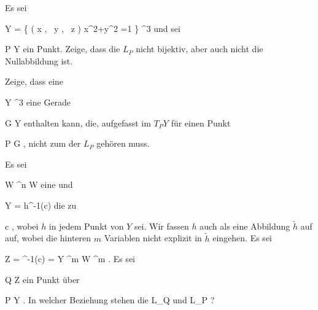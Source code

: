{}
{

Es sei

\mavergleichskettedisp
{\vergleichskette
{ Y
}
{ =} { \left\{  \left(  x   , \,   y  , \,  z                 \right)   \mid   x^2+y^2 =1         \right\}
}
{ \subseteq} { \R^3
}
{ } {
}
{ } {
}
}
{}{}{}
und sei

\mavergleichskette
{\vergleichskette
{ P
}
{ \in }{ Y
}
{  }{
}
{    }{
}
{   }{}
}
{}{}{}
ein Punkt. Zeige, dass die
$L_P$ nicht bijektiv, aber auch nicht die Nullabbildung ist.

}
{} {}

{}
{

Zeige, dass eine

\mavergleichskette
{\vergleichskette
{ Y
}
{ \subseteq }{ \R^3
}
{  }{
}
{    }{
}
{   }{
}
}
{}{}{}
eine Gerade

\mavergleichskette
{\vergleichskette
{ G
}
{ \subseteq }{ Y
}
{  }{
}
{    }{
}
{   }{
}
}
{}{}{}
enthalten kann, die, aufgefasst im
$T_PY$ für einen Punkt

\mavergleichskette
{\vergleichskette
{ P
}
{ \in }{ G
}
{  }{
}
{    }{
}
{   }{
}
}
{}{}{,}
nicht zum
der
$L_P$ gehören muss.

}
{} {}

{}
{

Es sei

\mavergleichskette
{\vergleichskette
{ W
}
{ \subseteq }{ \R^n
}
{  }{
}
{    }{
}
{   }{
}
}
{}{}{}
 { W } { \R
} {}
eine
und

\mavergleichskette
{\vergleichskette
{ Y
}
{ = }{ h^{-1}(c)
}
{  }{
}
{    }{
}
{   }{
}
}
{}{}{}
die
zu

\mavergleichskette
{\vergleichskette
{ c
}
{ \in }{ \R
}
{  }{
}
{    }{
}
{   }{
}
}
{}{}{,}
wobei $h$ in jedem Punkt von $Y$
sei. Wir fassen $h$ auch als eine Abbildung $\tilde{h}$  auf
 auf, wobei die hinteren $m$ Variablen nicht explizit in $\tilde{h}$ eingehen. Es sei

\mavergleichskettedisp
{\vergleichskette
{ Z
}
{ =} { ^{-1}(c)
}
{ =} { Y \times \R^m
}
{ \subseteq} { W \times \R^{m}
}
{ } {
}
}
{}{}{.}
Es sei

\mavergleichskette
{\vergleichskette
{ Q
}
{ \in }{ Z
}
{  }{
}
{    }{
}
{   }{
}
}
{}{}{}
ein Punkt über

\mavergleichskette
{\vergleichskette
{ P
}
{ \in }{ Y
}
{  }{
}
{    }{
}
{   }{
}
}
{}{}{.}
In welcher Beziehung stehen die
\mathkor {} {L_Q} {und} {L_P} {?}

}
{} {}


